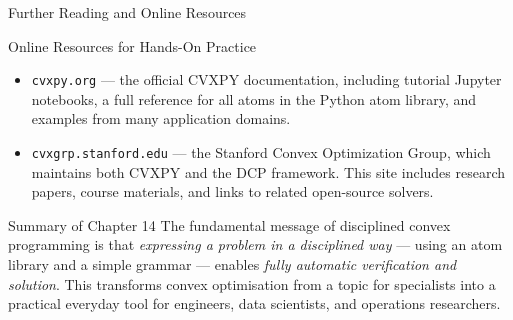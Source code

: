 \documentclass[aspectratio=169,10pt]{beamer}
\begin{document}
\begin{frame}[allowframebreaks]{Further Reading and Online Resources}
\begin{block}{Online Resources for Hands-On Practice}
\begin{itemize}
      \item \texttt{cvxpy.org} --- the official CVXPY documentation,
            including tutorial Jupyter notebooks, a full reference for
            all atoms in the Python atom library, and examples from
            many application domains.

      \item \texttt{cvxgrp.stanford.edu} --- the Stanford Convex
            Optimization Group, which maintains both CVXPY and the DCP
            framework.  This site includes research papers, course
            materials, and links to related open-source solvers.
    \end{itemize}
  \end{block}

  \begin{alertblock}{Summary of Chapter 14}
    The fundamental message of disciplined convex programming is that
    \emph{expressing a problem in a disciplined way} --- using an atom
    library and a simple grammar --- enables \emph{fully automatic
    verification and solution}.  This transforms convex optimisation
    from a topic for specialists into a practical everyday tool for
    engineers, data scientists, and operations researchers.
  \end{alertblock}

\end{frame}
\end{document}
